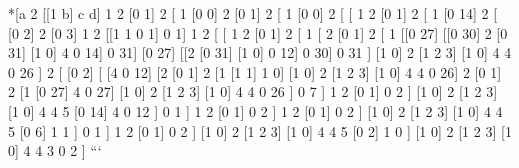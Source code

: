\documentclass[twoside]{article}
\begin{document}
*[a 2
  [[1 b] c d]
  1
  2
  [0 1]
  2
  [ 1
    [0 0]
    2
    [0 1]
    2
    [ 1
      [0 0]
      2
      [ [ 1
          2
          [0 1]
          2
          [ 1
            [0 14]
            2
            [ [0 2]
              2
              [0 3]
              1
              2
              [[1 1 0 1] 0 1]
              1
              2
              [ [ 1
                  2
                  [0 1]
                  2
                  [ 1
                    [ 2
                      [0 1]
                      2
                      [ 1
                        [[0 27] [[0 30] 2 [0 31] [1 0] 4 0 14] 0 31]
                        [0 27]
                        [[2 [0 31] [1 0] 0 12] 0 30]
                        0
                        31
                      ]
                      [1 0]
                      2
                      [1 2 3]
                      [1 0]
                      4
                      4
                      0
                      26
                    ]
                    2
                    [ [0 2]
                      [ [4 0 12]
                        [2 [0 1] 2 [1 [1 1] 1 0] [1 0] 2 [1 2 3] [1 0] 4 4 0 26]
                        2
                        [0 1]
                        2
                        [1 [0 27] 4 0 27]
                        [1 0]
                        2
                        [1 2 3]
                        [1 0]
                        4
                        4
                        0
                        26
                      ]
                      0
                      7
                    ]
                    1
                    2
                    [0 1]
                    0
                    2
                  ]
                  [1 0]
                  2
                  [1 2 3]
                  [1 0]
                  4
                  4
                  5
                  [0 14]
                  4
                  0
                  12
                ]
                0
                1
              ]
              1
              2
              [0 1]
              0
              2
            ]
            1
            2
            [0 1]
            0
            2
          ]
          [1 0]
          2
          [1 2 3]
          [1 0]
          4
          4
          5
          [0 6]
          1
          1
        ]
        0
        1
      ]
      1
      2
      [0 1]
      0
      2
    ]
    [1 0]
    2
    [1 2 3]
    [1 0]
    4
    4
    5
    [0 2]
    1
    0
  ]
  [1 0]
  2
  [1 2 3]
  [1 0]
  4
  4
  3
  0
  2
]
```

\end{document}
